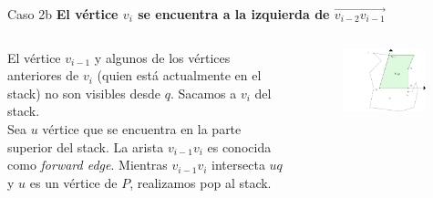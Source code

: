 \documentclass[aspectratio=169,xcolor=dvipsnames, t]{beamer}
\begin{document}
\begin{frame}{Caso 2b}
    \textbf{El vértice $v_{i}$ se encuentra a la izquierda de $\overrightarrow{v_{i-2}v_{i-1}}$}\\
    \vspace{0.5cm}
    \begin{columns}
    \begin{column}{0.45\textwidth}
    \small
        El vértice $v_{i-1}$ y algunos de los vértices anteriores de $v_{i}$ (quien está actualmente en el stack) no son visibles desde $q$. Sacamos a $v_{i}$ del stack. \\
        \vspace{0.5cm}
        Sea $u$ vértice que se encuentra en la parte superior del stack. La arista $v_{i-1}v_{i}$ es conocida como \textit{forward edge}. Mientras $v_{i-1}v_{i}$ intersecta $uq$ y $u$ es un vértice de $P$, realizamos pop al stack.\\
    \end{column}
    \begin{column}{0.45\textwidth}  %
    \vspace{-1.5cm}
        \begin{figure}
            \centering
            \includegraphics[width=0.95\textwidth]{imagenes/Caso2.4a.png}
        \end{figure}
    \end{column}
    \end{columns}
\end{frame}

\end{document}

